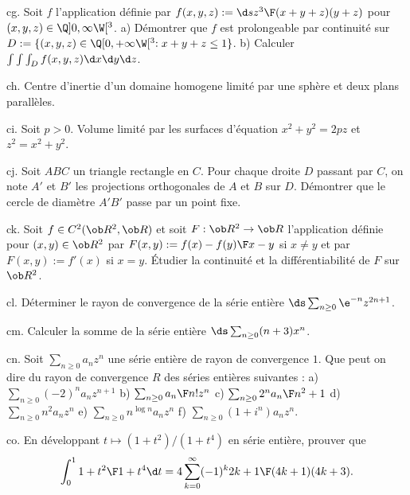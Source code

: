 \exo [Level=2,Fight=2,Learn=1,Field=\IntégralesMultiples|\FonctionsDePlusieursVariables,Type=\Exercices,Origin=]  cg. 
Soit $f$ l'application 
définie par $f(x,y,z):=\d s{z^3\F (x+y+z)(y+z)}$ pour $(x,y,z)\in\Q]0,\infty\W[^3$. \pn
a) Démontrer que $f$ est prolongeable par continuité sur 
$D:=\{(x,y,z)\in\Q[0,+\infty\W[^3:x+y+z\le 1\}$. \pn
b) Calculer $\int\int\int_Df(x,y,z)\d x\d y\d z$. 

\exo [Level=2,Fight=2,Learn=1,Field=\IntégralesMultiples,Type=\Exercices,Origin=] ch. 
Centre d'inertie d'un domaine homogene limité 
par une sphère et deux plans parallèles. 

\exo [Level=2,Fight=2,Learn=1,Field=\Volumes,Type=\Exercices,Origin=] ci. 
Soit $p>0$. 
Volume limité par les surfaces d'équation $x^2+y^2=2pz$ et $z^2=x^2+y^2$. 

\exo [Level=1,Fight=2,Learn=1,Field=\GéométriePlane,Type=\Exercices,Origin=]  cj. 
Soit $ABC$ un triangle rectangle en $C$. Pour chaque droite $D$ passant par $C$, 
on note $A'$ et $B'$ les projections orthogonales de $A$ et $B$ sur $D$. 
Démontrer que le cercle de diamètre $A'B'$ passe par un point fixe. 

\exo [Level=2,Fight=2,Learn=1,Field=\FonctionsDePlusieursVariables,Type=\Exercices,Origin=] ck. 
Soit $f\in\sc C^2(\ob R^2,\ob R)$ et soit $F:\ob R^2\to\ob R$ l'application 
définie pour $(x,y)\in\ob R^2$ par 
$F(x,y):={f(x)-f(y)\F x-y}$ si $x\neq y$ et par $F(x,y):=f'(x)$ si $x=y$. 
\'Etudier la continuité et la différentiabilité de $F$ sur $\ob R^2$. 

\exo [Level=2,Fight=0,Learn=0,Field=\SériesEntières,Type=\Exercices,Origin=] cl. 
Déterminer le rayon de convergence de la  série entière $\ds\sum_{n\ge0}\e^{-n}z^{2n+1}$. 

\exo [Level=2,Fight=1,Learn=0,Field=\SériesEntières,Type=\Exercices,Origin=] cm. 
Calculer la somme de la série entière $\ds\sum_{n\ge0}(n+3)x^n$.


\exo [Level=2,Fight=1,Learn=0,Field=\SériesEntières,Type=\Exercices,Origin=] cn. 
Soit $\sum_{n\ge0}a_nz^n$ une série entière de rayon de convergence $1$. 
Que peut on dire du rayon de convergence $R$ des séries entières suivantes : \pn
a) $\sum_{n\ge0}(-2)^na_nz^{n+1}$\qquad
b) $\sum_{n\ge0}{a_n\F n!}z^n$\qquad
c) $\sum_{n\ge0}{2^na_n\F n^2+1}$\qquad
d) $\sum_{n\ge0}n^2a_nz^n$\qquad
e) $\sum_{n\ge0}n^{\log n}a_n z^n$\qquad
f) $\sum_{n\ge0}(1+i^n)a_nz^n$. 

\exo [Level=2,Fight=2,Learn=2,Field=\SériesEntières,Type=\Exercices,Origin=] co. 
En développant $t\mapsto(1+t^2)/(1+t^4)$ en série entière, prouver que 
$$
\int_0^1{1+t^2\F1+t^4}\d t=4\sum_{k=0}^\infty(-1)^k{2k+1\F(4k+1)(4k+3)}.
$$

